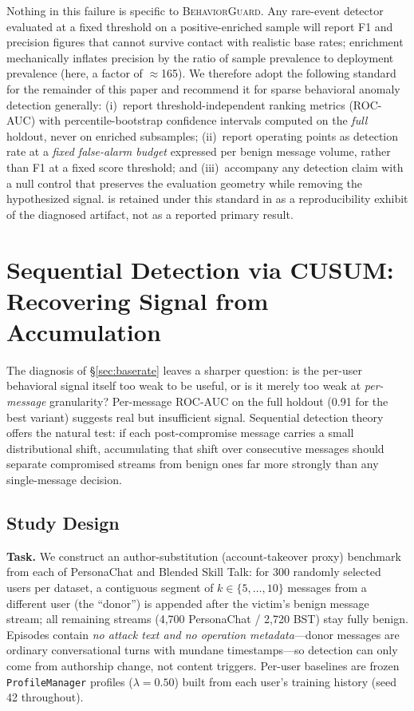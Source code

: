 \documentclass[conference]{IEEEtran}
\newcommand{\BG}{\textsc{BehaviorGuard}}
\begin{document}
Nothing in this failure is specific to \BG{}.
Any rare-event detector evaluated at a fixed threshold on a positive-enriched sample
will report F1 and precision figures that cannot survive contact with realistic base
rates; enrichment mechanically inflates precision by the ratio of sample prevalence
to deployment prevalence (here, a factor of $\approx$165).
We therefore adopt the following standard for the remainder of this paper and
recommend it for sparse behavioral anomaly detection generally:
(i)~report threshold-independent ranking metrics (ROC-AUC) with percentile-bootstrap
confidence intervals computed on the \emph{full} holdout, never on enriched subsamples;
(ii)~report operating points as detection rate at a \emph{fixed false-alarm budget}
expressed per benign message volume, rather than F1 at a fixed score threshold; and
(iii)~accompany any detection claim with a null control that preserves the
evaluation geometry while removing the hypothesized signal.
 is retained under this standard in  as a
reproducibility exhibit of the diagnosed artifact, not as a reported primary result.


\section{Sequential Detection via CUSUM: Recovering Signal from Accumulation}
\label{sec:cusum}

The diagnosis of \S\ref{sec:baserate} leaves a sharper question: is the per-user
behavioral signal itself too weak to be useful, or is it merely too weak at
\emph{per-message} granularity?
Per-message ROC-AUC on the full holdout (0.91 for the best variant) suggests real
but insufficient signal.
Sequential detection theory offers the natural test: if each post-compromise message
carries a small distributional shift, accumulating that shift over consecutive
messages should separate compromised streams from benign ones far more strongly than
any single-message decision.

\subsection{Study Design}
\label{sec:cusum:design}

\textbf{Task.}
We construct an author-substitution (account-takeover proxy) benchmark from each of
PersonaChat and Blended Skill Talk: for 300 randomly selected users per dataset, a
contiguous segment of $k \in \{5,\dots,10\}$ messages from a different user (the
``donor'') is appended after the victim's benign message stream; all remaining
streams (4{,}700 PersonaChat / 2{,}720 BST) stay fully benign.
Episodes contain \emph{no attack text and no operation metadata}---donor messages
are ordinary conversational turns with mundane timestamps---so detection can only
come from authorship change, not content triggers.
Per-user baselines are frozen \texttt{ProfileManager} profiles ($\lambda{=}0.50$)
built from each user's training history (seed 42 throughout).
\end{document}
